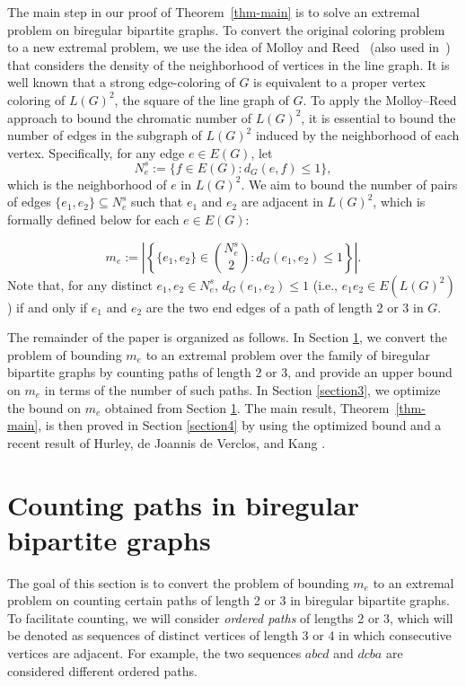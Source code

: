 \documentclass[11pt]{amsart}
\begin{document}
The main step in our proof of Theorem~\ref{thm-main} is to solve an extremal problem on biregular bipartite graphs. To convert the original coloring problem to a new extremal problem, we use the idea of Molloy and Reed~\cite{MolloyReed1997} (also used in~\cite{BruhnJoos2018StrongerBoundStrongChromaticIndex,BonamyPerrettPostle2022SparseNeighbourhoods,HurleyJoannisKang2022ImprovedProcedure}) that considers the density of the neighborhood of vertices in the line graph. 
It is well known that a strong edge-coloring of $G$ is equivalent to a proper vertex coloring of $L(G)^2$, the square of the line graph of $G$. To apply the Molloy--Reed approach to bound the chromatic number of $L(G)^2$, it is essential to bound the number of edges in the subgraph of $L(G)^2$ induced by the neighborhood of each vertex. 
Specifically, for any edge $e\in E(G)$, let
$$N_e^s:=\Big\{f\in E(G): d_G(e,f)\le 1\Big\},$$ 
which is the neighborhood of $e$ in $L(G)^2$. We aim to bound the number of pairs of edges $\{e_1,e_2\}\subseteq N_e^s$ such that $e_1$ and $e_2$ are adjacent in $L(G)^2$, which is formally defined below  for each $e\in E(G)$: 

\begin{equation*}
m_e:=\left|\left\{\{e_1,e_2\}\in {N_e^s\choose 2}:  d_G(e_1,e_2)\le 1\right\}\right|.
\end{equation*}
Note that, for any distinct $e_1, e_2 \in N_e^s$, $d_G(e_1,e_2)\le 1$ (i.e., $e_1e_2\in E(L(G)^2)$) if and only if  $e_1$ and $e_2$ are the two end edges of a path of length 2 or 3 in $G$. 

The remainder of the paper is organized as follows.
In Section \ref{section2}, we convert the problem of bounding $m_e$ to an extremal problem over the family of biregular bipartite graphs by counting paths of length 2 or 3, and provide an upper bound on $m_e$ in terms of the number of such paths. In Section \ref{section3}, we optimize the bound on $m_e$ obtained from Section \ref{section2}.   The main result,  Theorem~\ref{thm-main}, is then proved in Section \ref{section4} by using the optimized bound and a recent result of Hurley, de Joannis de Verclos, and Kang \cite{HurleyJoannisKang2022ImprovedProcedure}. 

\section{Counting paths in biregular bipartite graphs}\label{section2}




The goal of this section is to convert the problem of bounding $m_e$ to an extremal problem on counting certain paths of length 2 or 3 in biregular bipartite graphs. To facilitate counting, we will consider {\it ordered paths} of lengths 2 or 3, which will be denoted as sequences of distinct vertices of length 3 or 4 in which consecutive vertices are adjacent. For example, the two sequences $abcd$ and $dcba$ are considered different ordered paths.
\end{document}
